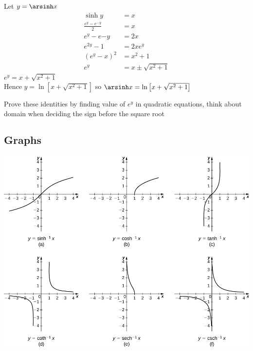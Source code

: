 \begin{solution}
    Let $y=\arsinh x$
    \begin{align*}
        \sinh y               & = x                    \\
        \frac{e^y-e^{-y}}{2} & = x                    \\
        e^y-e{-y}             & = 2x                   \\
        e^{2y} - 1            & = 2x e^y               \\
        (e^y-x)^2             & = x^2 + 1              \\
        e^y                   & = x \pm \sqrt{x^2 + 1}
    \end{align*}
    $e^y = x + \sqrt{x^2 + 1}$ \\
    Hence $y = \ln \left[x+\sqrt{x^2+1}\right]$ so $\arsinh x = \ln \left[x+\sqrt{x^2+1}\right]$
\end{solution}

\begin{remark}
    Prove these identities by finding value of $e^y$ in quadratic equations, think about domain when deciding the sign before the square root
\end{remark}

\subsection{Graphs}
\includegraphics[width=\linewidth]{images/hyperbolic_inverse_graphs}



